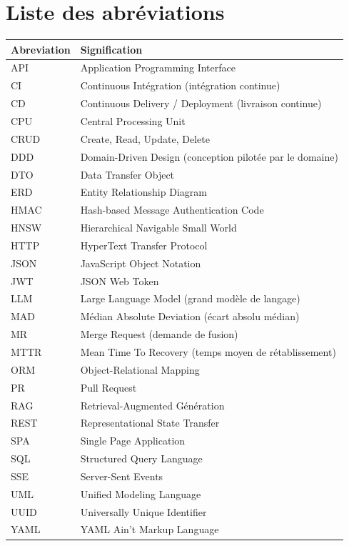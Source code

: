 \documentclass[12pt,a4paper,oneside]{report}
\begin{document}
\setcounter{page}{2}

\renewcommand{\contentsname}{Table des matières}
\tableofcontents
\thispagestyle{fancy}

\clearpage
\renewcommand{\listfigurename}{Liste des figures}
\listoffigures

\clearpage
\chapter*{Liste des abréviations}

\begin{longtable}{@{}p{3cm}p{11.5cm}@{}}
\toprule
\textbf{Abreviation} & \textbf{Signification} \\
\midrule
\endhead
API & Application Programming Interface \\
CI & Continuous Intégration (intégration continue) \\
CD & Continuous Delivery / Deployment (livraison continue) \\
CPU & Central Processing Unit \\
CRUD & Create, Read, Update, Delete \\
DDD & Domain-Driven Design (conception pilotée par le domaine) \\
DTO & Data Transfer Object \\
ERD & Entity Relationship Diagram \\
HMAC & Hash-based Message Authentication Code \\
HNSW & Hierarchical Navigable Small World \\
HTTP & HyperText Transfer Protocol \\
JSON & JavaScript Object Notation \\
JWT & JSON Web Token \\
LLM & Large Language Model (grand modèle de langage) \\
MAD & Médian Absolute Deviation (écart absolu médian) \\
MR & Merge Request (demande de fusion) \\
MTTR & Mean Time To Recovery (temps moyen de rétablissement) \\
ORM & Object-Relational Mapping \\
PR & Pull Request \\
RAG & Retrieval-Augmented Génération \\
REST & Representational State Transfer \\
SPA & Single Page Application \\
SQL & Structured Query Language \\
SSE & Server-Sent Events \\
UML & Unified Modeling Language \\
UUID & Universally Unique Identifier \\
YAML & YAML Ain't Markup Language \\
\bottomrule
\end{longtable}
\end{document}
